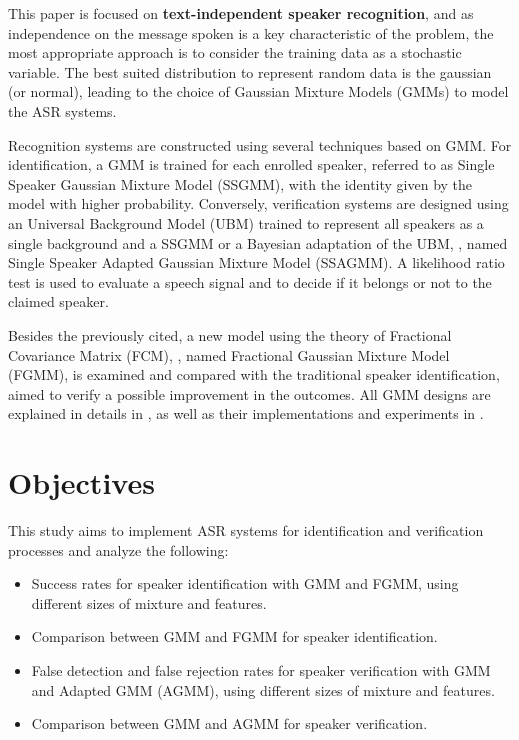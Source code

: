 This paper is focused on \textbf{text-independent speaker recognition}, and as independence on the message spoken is a key characteristic of the problem, the most appropriate approach is to consider the training data as a stochastic variable. The best suited distribution to represent random data is the gaussian (or normal), leading to the choice of Gaussian Mixture Models (GMMs) to model the ASR systems.

Recognition systems are constructed using several techniques based on GMM. For identification, a GMM is trained for each enrolled speaker, referred to as Single Speaker Gaussian Mixture Model (SSGMM), with the identity given by the model with higher probability. Conversely, verification systems are designed using an Universal Background Model (UBM) trained to represent all speakers as a single background and a SSGMM or a Bayesian adaptation of the UBM, , named Single Speaker Adapted Gaussian Mixture Model (SSAGMM). A likelihood ratio test is used to evaluate a speech signal and to decide if it belongs or not to the claimed speaker.

Besides the previously cited, a new model using the theory of Fractional Covariance Matrix (FCM), , named Fractional Gaussian Mixture Model (FGMM), is examined and compared with the traditional speaker identification, aimed to verify a possible improvement in the outcomes. All GMM designs are explained in details in , as well as their implementations and experiments in .

\section{Objectives}

This study aims to implement ASR systems for identification and verification processes and analyze the following:

\begin{itemize}\itemsep0pt
    \item Success rates for speaker identification with GMM and FGMM, using different sizes of mixture and features.
    \item Comparison between GMM and FGMM for speaker identification.
    \item False detection and false rejection rates for speaker verification with GMM and Adapted GMM (AGMM), using different sizes of mixture and features.
    \item Comparison between GMM and AGMM for speaker verification.
\end{itemize}

